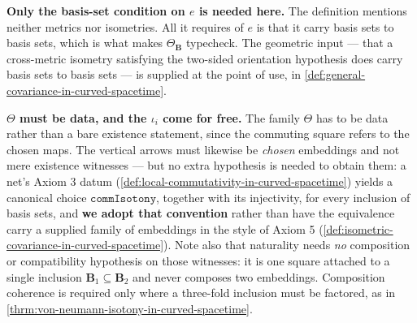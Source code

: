 \begin{definition}
    \textbf{Only the basis-set condition on $e$ is needed here.} The definition mentions neither metrics nor isometries. All it requires of $e$ is that it carry basis sets to basis sets, which is what makes $\Theta_{\mathbf{B}}$ typecheck. The geometric input --- that a cross-metric isometry satisfying the two-sided orientation hypothesis does carry basis sets to basis sets --- is supplied at the point of use, in \ref{def:general-covariance-in-curved-spacetime}.

    \textbf{$\Theta$ must be data, and the $\iota_i$ come for free.} The family $\Theta$ has to be data rather than a bare existence statement, since the commuting square refers to the chosen maps. The vertical arrows must likewise be \emph{chosen} embeddings and not mere existence witnesses --- but no extra hypothesis is needed to obtain them: a net's Axiom 3 datum (\ref{def:local-commutativity-in-curved-spacetime}) yields a canonical choice $\mathtt{commIsotony}$, together with its injectivity, for every inclusion of basis sets, and \textbf{we adopt that convention} rather than have the equivalence carry a supplied family of embeddings in the style of Axiom 5 (\ref{def:isometric-covariance-in-curved-spacetime}). Note also that naturality needs \emph{no} composition or compatibility hypothesis on those witnesses: it is one square attached to a single inclusion $\mathbf{B}_1 \subseteq \mathbf{B}_2$ and never composes two embeddings. Composition coherence is required only where a three-fold inclusion must be factored, as in \ref{thrm:von-neumann-isotony-in-curved-spacetime}.
\end{definition}

